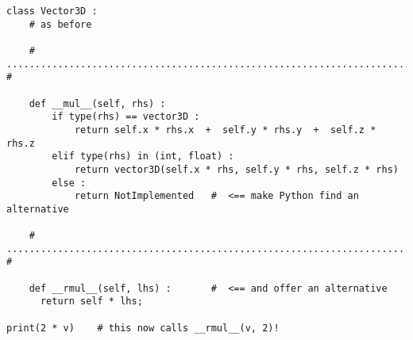 
\begin{frame}[fragile]
%
\begin{codebox}
\begin{verbatim}
class Vector3D :
    # as before
    
    # ........................................................................ #
    
    def __mul__(self, rhs) :
        if type(rhs) == vector3D :
            return self.x * rhs.x  +  self.y * rhs.y  +  self.z * rhs.z
        elif type(rhs) in (int, float) :
            return vector3D(self.x * rhs, self.y * rhs, self.z * rhs)
        else :
            return NotImplemented   #  <== make Python find an alternative
    
    # ........................................................................ #
    
    def __rmul__(self, lhs) :       #  <== and offer an alternative
      return self * lhs;

print(2 * v)    # this now calls __rmul__(v, 2)!
\end{verbatim}
\end{codebox}
%
\end{frame}


